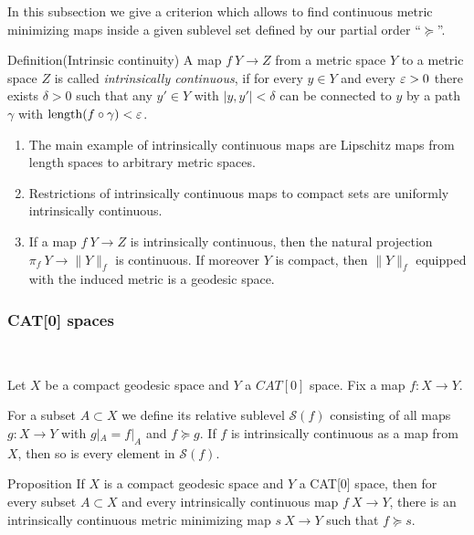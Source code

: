 \documentclass[a4paper,10pt]{amsart}
\begin{document}
In this subsection we give a criterion which allows to 
find continuous metric minimizing maps inside a given sublevel set defined by our partial order ``$\succcurlyeq$''.

\begin{thm}{Definition}(Intrinsic continuity)
A map $f\:Y\to Z$ from a metric space $Y$ to a metric space
 $Z$ is called
{\em intrinsically continuous}, if for every $y\in Y$ 
and every $\varepsilon>0$ there
exists $\delta>0$ such that any  $y'\in Y$
with $|y,y'|<\delta$ can be connected to $y$ by a path $\gamma$ 
with $\mathop{\rm length}\nolimits(f\circ\gamma)<\varepsilon$.
\end{thm}

\begin{enumerate}
 \item The main example of intrinsically continuous maps are Lipschitz
maps from length spaces to arbitrary metric spaces.
\item Restrictions of intrinsically continuous maps to compact sets are uniformly intrinsically continuous. 
\item If a map $f\:Y\to Z$ is intrinsically continuous, then 
the natural projection $\pi_f\:Y\rightarrow \|Y\|_f$ is continuous. If
moreover $Y$ is compact, then $\|Y\|_f$ equipped with the induced 
metric is a geodesic space.
\end{enumerate}



\subsubsection{CAT[0] spaces}~

\medskip

Let $X$ be a compact geodesic space and $Y$ a $CAT[0]$ space. Fix a map  
$f:X\to Y$.

For a subset $A\subset X$  we 
define its relative sublevel $\mathcal{S}(f)$ consisting of all maps $g:X\to Y$
with $g|_{A}=f|_{A}$ and $f\succcurlyeq g$. If $f$ is intrinsically continuous as a map from $X$, then
so is every element in $\mathcal{S}(f)$. 

\begin{thm}{Proposition}\label{prop:exist}
 If $X$ is a compact geodesic space and $Y$ a CAT[0] space, then for every subset $A\subset X$ and every intrinsically continuous map $f\:X\rightarrow Y$,
 there is an intrinsically continuous  metric minimizing map $s\:X\rightarrow Y$
 such that $f\succcurlyeq s$.
\end{thm}
\end{document}
